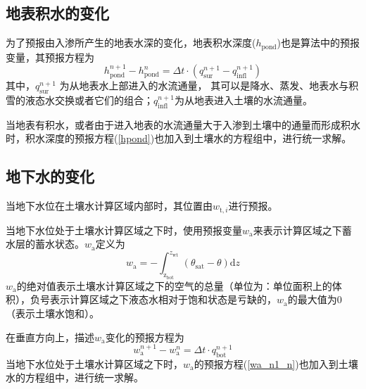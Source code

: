 \subsection{地表积水的变化}
为了预报由入渗所产生的地表水深的变化，地表积水深度($h_{\mathrm{pond}}$)也是算法中的预报变量，其预报方程为
\begin{equation}\label{hpond}
  h_{\mathrm{ {pond }}}^{n+1}-h_{\mathrm{ {pond }}}^{n}=\Delta t \cdot\left(q_{\mathrm{ {sur }}}^{n+1}-q_{\mathrm{ {infl }}}^{n+1}\right)
\end{equation}
其中，$q_{\mathrm{sur}}^{n+1} $ 为从地表水上部进入的水流通量，
其可以是降水、蒸发、地表水与积雪的液态水交换或者它们的组合；$q_{\mathrm{infl}}^{n+1}$为从地表进入土壤的水流通量。


当地表有积水，或者由于进入地表的水流通量大于入渗到土壤中的通量而形成积水时，积水深度的预报方程(\ref{hpond})也加入到土壤水的方程组中，进行统一求解。


\subsection{地下水的变化}
当地下水位在土壤水计算区域内部时，其位置由$w_{\mathrm{t},i}$进行预报。

当地下水位处于土壤水计算区域之下时，使用预报变量$w_{\mathrm {a}} $来表示计算区域之下蓄水层的蓄水状态。$w_{\mathrm {a}} $定义为
\begin{equation}
  w_{\mathrm{a}}=-\int_{\mathrm{z_{\mathrm{bot}}}}^{z_{\mathrm{wt}}}\left(\theta_{\mathrm{sat}}-\theta\right){\mathrm { d}} z
\end{equation}
$w_{\mathrm {a}} $的绝对值表示土壤水计算区域之下的空气的总量（单位为：单位面积上的体积），负号表示计算区域之下液态水相对于饱和状态是亏缺的，$w_{\mathrm {a}} $的最大值为0（表示土壤水饱和）。

在垂直方向上，描述$w_{\mathrm {a}} $变化的预报方程为
\begin{equation}\label{wa_n1_n}
  w_{\mathrm{a}}^{n+1}-w_{\mathrm{a}}^{n}=\Delta t \cdot q_{\mathrm{bot}}^{n+1}
\end{equation}
当地下水位处于土壤水计算区域之下时，$w_{\mathrm {a}} $的预报方程(\ref{wa_n1_n})也加入到土壤水的方程组中，进行统一求解。

